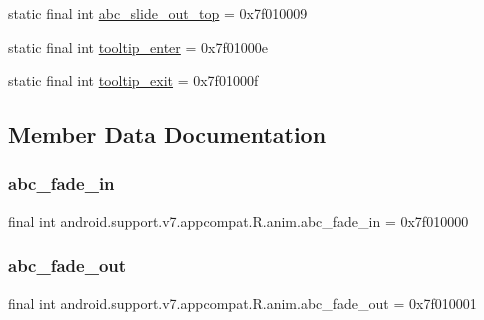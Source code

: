\begin{DoxyCompactItemize}
\item 
static final int \mbox{\hyperlink{classandroid_1_1support_1_1v7_1_1appcompat_1_1R_1_1anim_aeeecf1b8df70f0cdb528bf29ffc04fa8}{abc\+\_\+slide\+\_\+out\+\_\+top}} = 0x7f010009
\item 
static final int \mbox{\hyperlink{classandroid_1_1support_1_1v7_1_1appcompat_1_1R_1_1anim_a94d29e83fb2fe1d19263420662803bb8}{tooltip\+\_\+enter}} = 0x7f01000e
\item 
static final int \mbox{\hyperlink{classandroid_1_1support_1_1v7_1_1appcompat_1_1R_1_1anim_a63f8c6b5e6b0bc1f40f81e1c7944f45a}{tooltip\+\_\+exit}} = 0x7f01000f
\end{DoxyCompactItemize}


\subsection{Member Data Documentation}
\mbox{\label{classandroid_1_1support_1_1v7_1_1appcompat_1_1R_1_1anim_a665e81e9b94944163fe09d845ed3acb4}} 
\subsubsection{\texorpdfstring{abc\+\_\+fade\+\_\+in}{abc\_fade\_in}}
{\footnotesize\ttfamily final int android.\+support.\+v7.\+appcompat.\+R.\+anim.\+abc\+\_\+fade\+\_\+in = 0x7f010000\hspace{0.3cm}{\ttfamily [static]}}

\mbox{\label{classandroid_1_1support_1_1v7_1_1appcompat_1_1R_1_1anim_a9ee34f536803896c9ff3565989bbbeef}} 
\subsubsection{\texorpdfstring{abc\+\_\+fade\+\_\+out}{abc\_fade\_out}}
{\footnotesize\ttfamily final int android.\+support.\+v7.\+appcompat.\+R.\+anim.\+abc\+\_\+fade\+\_\+out = 0x7f010001\hspace{0.3cm}{\ttfamily [static]}}

